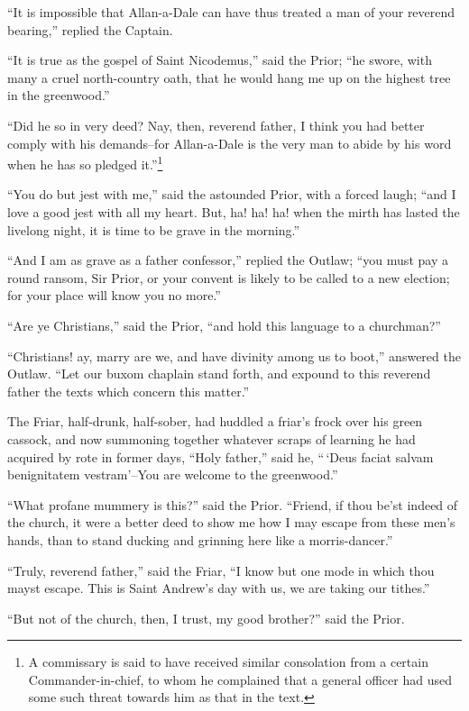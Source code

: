 ``It is impossible that Allan-a-Dale can have thus treated a man of your
reverend bearing,'' replied the Captain.

``It is true as the gospel of Saint Nicodemus,'' said the Prior; ``he
swore, with many a cruel north-country oath, that he would hang me up on
the highest tree in the greenwood.''

``Did he so in very deed? Nay, then, reverend father, I think you had
better comply with his demands--for Allan-a-Dale is the very man to
abide by his word when he has so pledged it.''\footnote{A commissary is
said to have received similar
consolation from a certain Commander-in-chief, to whom he complained
that a general officer had used some such threat towards him as that in
the text.}

``You do but jest with me,'' said the astounded Prior, with a forced
laugh; ``and I love a good jest with all my heart. But, ha! ha! ha! when
the mirth has lasted the livelong night, it is time to be grave in the
morning.''

``And I am as grave as a father confessor,'' replied the Outlaw; ``you
must pay a round ransom, Sir Prior, or your convent is likely to be
called to a new election; for your place will know you no more.''

``Are ye Christians,'' said the Prior, ``and hold this language to a
churchman?''

``Christians! ay, marry are we, and have divinity among us to boot,''
answered the Outlaw. ``Let our buxom chaplain stand forth, and expound
to this reverend father the texts which concern this matter.''

The Friar, half-drunk, half-sober, had huddled a friar's frock over his
green cassock, and now summoning together whatever scraps of learning he
had acquired by rote in former days, ``Holy father,'' said he, ``\,`Deus
faciat salvam benignitatem vestram'--You are welcome to the greenwood.''

``What profane mummery is this?'' said the Prior. ``Friend, if thou
be'st indeed of the church, it were a better deed to show me how I may
escape from these men's hands, than to stand ducking and grinning here
like a morris-dancer.''

``Truly, reverend father,'' said the Friar, ``I know but one mode in
which thou mayst escape. This is Saint Andrew's day with us, we are
taking our tithes.''

``But not of the church, then, I trust, my good brother?'' said the
Prior.

